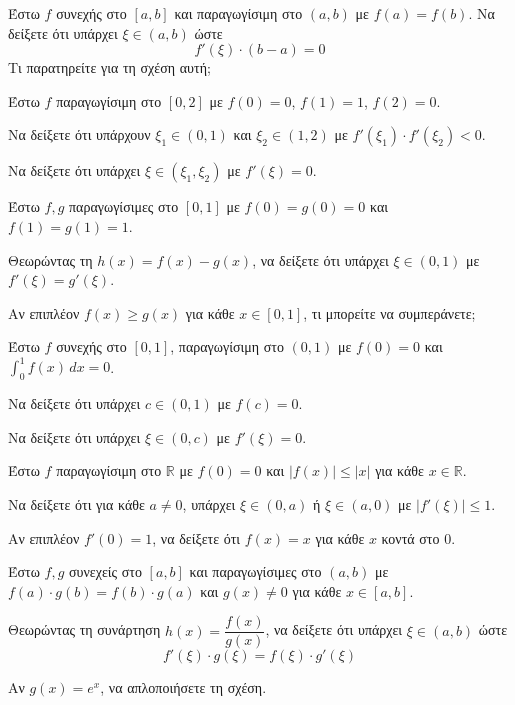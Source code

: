 \documentclass[11pt,a4paper,modern]{FFExercises}
\begin{document}

\askhsh
Έστω $f$ συνεχής στο $[a, b]$ και παραγωγίσιμη στο $(a, b)$ με $f(a) = f(b)$. Να δείξετε ότι υπάρχει $\xi \in (a, b)$ ώστε
\[
f'(\xi) \cdot (b - a) = 0
\]
Τι παρατηρείτε για τη σχέση αυτή;

\askhsh
Έστω $f$ παραγωγίσιμη στο $[0, 2]$ με $f(0) = 0$, $f(1) = 1$, $f(2) = 0$.
\begin{alist}
  \item Να δείξετε ότι υπάρχουν $\xi_1 \in (0, 1)$ και $\xi_2 \in (1, 2)$ με $f'(\xi_1) \cdot f'(\xi_2) < 0$.
  \item Να δείξετε ότι υπάρχει $\xi \in (\xi_1, \xi_2)$ με $f'(\xi) = 0$.
\end{alist}

\askhsh
Έστω $f, g$ παραγωγίσιμες στο $[0, 1]$ με $f(0) = g(0) = 0$ και $f(1) = g(1) = 1$.
\begin{alist}
  \item Θεωρώντας τη $h(x) = f(x) - g(x)$, να δείξετε ότι υπάρχει $\xi \in (0, 1)$ με $f'(\xi) = g'(\xi)$.
  \item Αν επιπλέον $f(x) \geq g(x)$ για κάθε $x \in [0, 1]$, τι μπορείτε να συμπεράνετε;
\end{alist}

\askhsh
Έστω $f$ συνεχής στο $[0, 1]$, παραγωγίσιμη στο $(0, 1)$ με $f(0) = 0$ και $\displaystyle\int_0^1 f(x)\,dx = 0$.
\begin{alist}
  \item Να δείξετε ότι υπάρχει $c \in (0, 1)$ με $f(c) = 0$.
  \item Να δείξετε ότι υπάρχει $\xi \in (0, c)$ με $f'(\xi) = 0$.
\end{alist}

\askhsh
Έστω $f$ παραγωγίσιμη στο $\mathbb{R}$ με $f(0) = 0$ και $|f(x)| \leq |x|$ για κάθε $x \in \mathbb{R}$.
\begin{alist}
  \item Να δείξετε ότι για κάθε $a \neq 0$, υπάρχει $\xi \in (0, a)$ ή $\xi \in (a, 0)$ με $|f'(\xi)| \leq 1$.
  \item Αν επιπλέον $f'(0) = 1$, να δείξετε ότι $f(x) = x$ για κάθε $x$ κοντά στο $0$.
\end{alist}

\askhsh
Έστω $f, g$ συνεχείς στο $[a, b]$ και παραγωγίσιμες στο $(a, b)$ με $f(a) \cdot g(b) = f(b) \cdot g(a)$ και $g(x) \neq 0$ για κάθε $x \in [a, b]$.
\begin{alist}
  \item Θεωρώντας τη συνάρτηση $h(x) = \dfrac{f(x)}{g(x)}$, να δείξετε ότι υπάρχει $\xi \in (a, b)$ ώστε
  \[
  f'(\xi) \cdot g(\xi) = f(\xi) \cdot g'(\xi)
  \]
  \item Αν $g(x) = e^x$, να απλοποιήσετε τη σχέση.
\end{alist}
\end{document}
